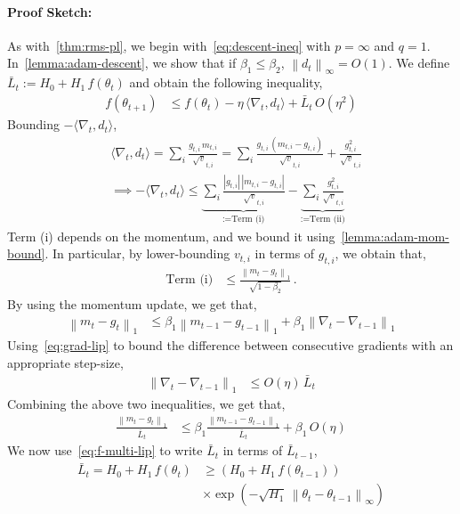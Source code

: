 \documentclass{article}
\newcommand{\ti}[1]{#1_{t,i}}
\newcommand{\norm}[1]{\left\|#1 \right\|}
\newcommand{\tht}{\theta_t}
\newcommand{\thtt}{\theta_{t+1}}
\begin{document}
\paragraph{Proof Sketch:} As with~\cref{thm:rms-pl}, we begin with~\cref{eq:descent-ineq} with $p = \infty$ and $q = 1$. In~\cref{lemma:adam-descent}, we show that if $\beta_1 \leq \beta_2$, $\norm{d_t}_\infty = O(1)$. We define  $\bar{L}_t := H_0 + H_1 \, f(\tht)$ and obtain the following inequality, 
\begin{align}
f(\thtt) & \leq f(\tht) - \eta \, \langle \nabla_t, d_t \rangle + \bar{L}_t \, O(\eta^2)
\label{eq:adam-main-1}
\end{align}
Bounding $- \langle \nabla_t, d_t \rangle$,
\begin{align*}
& \langle \nabla_t, d_t \rangle = \sum_i \frac{\ti{g} \, \ti{m}}{\ti{\sqrt{v}}} = \sum_i \frac{\ti{g} \, (\ti{m} - \ti{g})}{\ti{\sqrt{v}}} + \frac{\ti{g^2}}{\ti{\sqrt{v}}} \\
& \implies - \langle \nabla_t, d_t \rangle \leq \underbrace{\sum_i \frac{|\ti{g}| \, |\ti{m} - \ti{g}|}{\ti{\sqrt{v}}}}_{:= \text{Term (i)}} - \underbrace{\sum_i \frac{\ti{g^2}}{\ti{\sqrt{v}}}}_{:= \text{Term (ii)}}
\end{align*}
Term (i) depends on the momentum, and we bound it using~\cref{lemma:adam-mom-bound}. In particular, by lower-bounding $\ti{v}$ in terms of $\ti{g}$, we obtain that, 
\begin{align}
\text{Term (i)} &\leq \frac{\norm{m_t - g_t}_1}{\sqrt{1 - \beta_2}}\,. \label{eq:adam-main-inter-1}
\end{align}
By using the momentum update, we get that,
\begin{align}
\norm{m_t - g_t}_1 & \leq \beta_1 \norm{m_{t-1} - g_{t-1}}_1 + \beta_1 \norm{\nabla_t - \nabla_{t-1}}_1 \nonumber
\end{align}
Using~\cref{eq:grad-lip} to bound the difference between consecutive gradients with an appropriate step-size, 
\begin{align}
\norm{\nabla_t - \nabla_{t-1}}_1 & \leq O(\eta) \, \bar{L}_t \nonumber
\end{align}
Combining the above two inequalities, we get that, 
\begin{align}
\frac{\norm{m_t - g_t}_1}{\bar{L}_t} & \leq \beta_1 \frac{\norm{m_{t-1} - g_{t-1}}_1}{\bar{L}_t} + \beta_1 \, O(\eta) \nonumber
\end{align}
We now use~\cref{eq:f-multi-lip} to write $\bar{L}_t$ in terms of $\bar{L}_{t-1}$, 
\begin{align}
\bar{L}_t = H_0 + H_1 \, f(\tht) & \geq \left(H_0 + H_1 \, f(\theta_{t-1}) \right) \nonumber\\ 
& \times \exp\left(-\sqrt{H_1} \, \norm{\tht - \theta_{t-1}}_{\infty} \right) \nonumber
\end{align}
\end{document}
